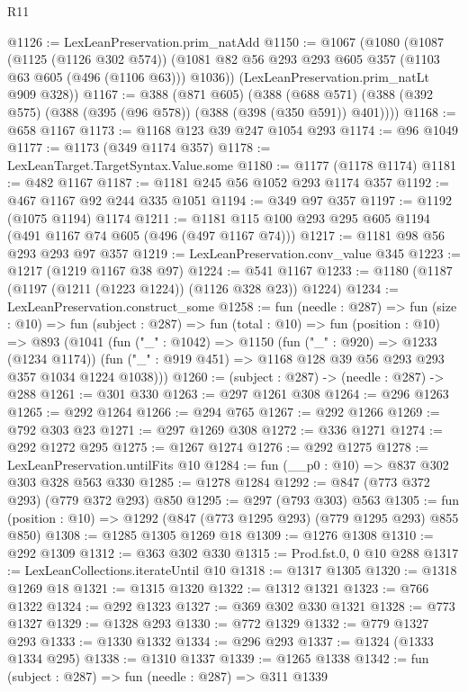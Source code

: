 \begin{lexlean}{R11}
\begin{coremodule}
@1126 := LexLeanPreservation.prim_natAdd
@1150 := @1067
    (@1080
      (@1087
        (@1125 (@1126 @302 @574))
        (@1081 @82 @56 @293 @293 @605 @357 (@1103 @63 @605 (@496 (@1106 @63))) @1036))
      (LexLeanPreservation.prim_natLt @909 @328))
@1167 := @388
    (@871 @605)
    (@388 (@688 @571) (@388 (@392 @575) (@388 (@395 (@96 @578)) (@388 (@398 (@350 @591)) @401))))
@1168 := @658 @1167
@1173 := @1168 @123 @39 @247 @1054 @293
@1174 := @96 @1049
@1177 := @1173 (@349 @1174 @357)
@1178 := LexLeanTarget.TargetSyntax.Value.some
@1180 := @1177 (@1178 @1174)
@1181 := @482 @1167
@1187 := @1181 @245 @56 @1052 @293 @1174 @357
@1192 := @467 @1167 @92 @244 @335 @1051
@1194 := @349 @97 @357
@1197 := @1192 (@1075 @1194) @1174
@1211 := @1181 @115 @100 @293 @295 @605 @1194 (@491 @1167 @74 @605 (@496 (@497 @1167 @74)))
@1217 := @1181 @98 @56 @293 @293 @97 @357
@1219 := LexLeanPreservation.conv_value @345
@1223 := @1217 (@1219 @1167 @38 @97)
@1224 := @541 @1167
@1233 := @1180 (@1187 (@1197 (@1211 (@1223 @1224)) (@1126 @328 @23)) @1224)
@1234 := LexLeanPreservation.construct_some
@1258 := fun (needle : @287) =>
  fun (size : @10) =>
  fun (subject : @287) =>
  fun (total : @10) =>
  fun (position : @10) =>
  @893
    (@1041
      (fun ("_" : @1042) =>
      @1150
        (fun ("_" : @920) => @1233 (@1234 @1174))
        (fun ("_" : @919 @451) => @1168 @128 @39 @56 @293 @293 @357 @1034 @1224 @1038)))
@1260 := (subject : @287) -> (needle : @287) -> @288
@1261 := @301 @330
@1263 := @297 @1261 @308
@1264 := @296 @1263
@1265 := @292 @1264
@1266 := @294 @765
@1267 := @292 @1266
@1269 := @792 @303 @23
@1271 := @297 @1269 @308
@1272 := @336 @1271
@1274 := @292 @1272 @295
@1275 := @1267 @1274
@1276 := @292 @1275
@1278 := LexLeanPreservation.untilFits @10
@1284 := fun (__p0 : @10) => @837 @302 @303 @328 @563 @330
@1285 := @1278 @1284
@1292 := @847 (@773 @372 @293) (@779 @372 @293) @850
@1295 := @297 (@793 @303) @563
@1305 := fun (position : @10) => @1292 (@847 (@773 @1295 @293) (@779 @1295 @293) @855 @850)
@1308 := @1285 @1305 @1269 @18
@1309 := @1276 @1308
@1310 := @292 @1309
@1312 := @363 @302 @330
@1315 := Prod.fst.{0, 0} @10 @288
@1317 := LexLeanCollections.iterateUntil @10
@1318 := @1317 @1305
@1320 := @1318 @1269 @18
@1321 := @1315 @1320
@1322 := @1312 @1321
@1323 := @766 @1322
@1324 := @292 @1323
@1327 := @369 @302 @330 @1321
@1328 := @773 @1327
@1329 := @1328 @293
@1330 := @772 @1329
@1332 := @779 @1327 @293
@1333 := @1330 @1332
@1334 := @296 @293
@1337 := @1324 (@1333 @1334 @295)
@1338 := @1310 @1337
@1339 := @1265 @1338
@1342 := fun (subject : @287) => fun (needle : @287) => @311 @1339

\end{coremodule}
\end{lexlean}
